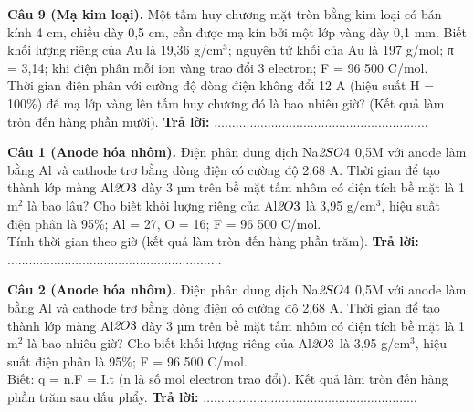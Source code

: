 \documentclass{article}
\begin{document}
\fontsize{24}{32}\selectfont
\textbf{Câu 9 (Mạ kim loại).} Một tấm huy chương mặt tròn bằng kim loại có bán kính 4 cm, chiều dày 0,5 cm, cần được mạ kín bởi một lớp vàng dày 0,1 mm. Biết khối lượng riêng của Au là 19,36 g/cm$^{\text{3}}$; nguyên tử khối của Au là 197 g/mol; π = 3,14; khi điện phân mỗi ion vàng trao đổi 3 electron; F = 96 500 C/mol.\\ 
Thời gian điện phân với cường độ dòng điện không đổi 12 A (hiệu suất H = 100\%) để mạ lớp vàng lên tấm huy chương đó là bao nhiêu giờ? (Kết quả làm tròn đến hàng phần mười).
\vspace{12pt}
\textbf{Trả lời:} $\dots\dots\dots\dots\dots\dots\dots\dots\dots\dots\dots\dots\dots\dots\dots\dots\dots\dots\dots\dots$
\vspace*{\fill}
\newpage

\fontsize{24}{32}\selectfont
\textbf{Câu 1 (Anode hóa nhôm).} Điện phân dung dịch Na$\textit{{\text{2}}$SO$}{\text{4}}$ 0,5M với anode làm bằng Al và cathode trơ bằng dòng điện có cường độ 2,68 A. Thời gian để tạo thành lớp màng Al$\textit{{\text{2}}$O$}{\text{3}}$ dày 3 µm trên bề mặt tấm nhôm có diện tích bề mặt là 1 m$^{\text{2}}$ là bao lâu? Cho biết khối lượng riêng của Al$\textit{{\text{2}}$O$}{\text{3}}$ là 3,95 g/cm$^{\text{3}}$, hiệu suất điện phân là 95\%; Al = 27, O = 16; F = 96 500 C/mol.\\ 
Tính thời gian theo giờ (kết quả làm tròn đến hàng phần trăm).
\vspace{12pt}
\textbf{Trả lời:} $\dots\dots\dots\dots\dots\dots\dots\dots\dots\dots\dots\dots\dots\dots\dots\dots\dots\dots\dots\dots$
\vspace*{\fill}
\newpage

\fontsize{24}{32}\selectfont
\textbf{Câu 2 (Anode hóa nhôm).} Điện phân dung dịch Na$\textit{{\text{2}}$SO$}{\text{4}}$ 0,5M với anode làm bằng Al và cathode trơ bằng dòng điện có cường độ 2,68 A. Thời gian để tạo thành lớp màng Al$\textit{{\text{2}}$O$}{\text{3}}$ dày 3 µm trên bề mặt tấm nhôm có diện tích bề mặt là 1 m$^{\text{2}}$ là bao nhiêu giờ? Cho biết khối lượng riêng của Al$\textit{{\text{2}}$O$}{\text{3}}$ là 3,95 g/cm$^{\text{3}}$, hiệu suất điện phân là 95\%; F = 96 500 C/mol.\\ 
Biết: q = n.F = I.t (n là số mol electron trao đổi). Kết quả làm tròn đến hàng phần trăm sau dấu phẩy.
\vspace{12pt}
\textbf{Trả lời:} $\dots\dots\dots\dots\dots\dots\dots\dots\dots\dots\dots\dots\dots\dots\dots\dots\dots\dots\dots\dots$
\vspace*{\fill}
\newpage
\end{document}
